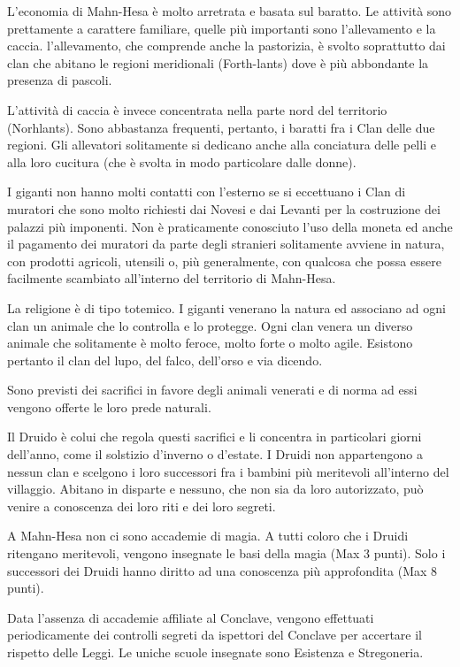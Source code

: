 \Economia L'economia di Mahn-Hesa \`e molto arretrata e basata sul baratto. Le
attivit\`a sono prettamente a carattere familiare, quelle pi\`u
importanti sono l'allevamento e la caccia. l'allevamento, che
comprende anche la pastorizia, \`e svolto soprattutto dai clan che
abitano le regioni meridionali (Forth-lants) dove \`e pi\`u
abbondante la presenza di pascoli.

L'attivit\`a di caccia \`e invece concentrata nella parte nord del
territorio (Norhlants). Sono abbastanza frequenti, pertanto, i
baratti fra i Clan delle due regioni. Gli allevatori solitamente si
dedicano anche alla conciatura delle pelli e alla loro cucitura (che
\`e svolta in modo particolare dalle donne).

I giganti non hanno molti contatti con l'esterno se si eccettuano i
Clan di muratori che sono molto richiesti dai Novesi e dai Levanti per
la costruzione dei palazzi pi\`u imponenti. Non \`e praticamente
conosciuto l'uso della moneta ed anche il pagamento dei muratori da
parte degli stranieri solitamente avviene in natura, con prodotti
agricoli, utensili o, pi\`u generalmente, con qualcosa che possa
essere facilmente scambiato all'interno del territorio di Mahn-Hesa.

\Religione La religione \`e di tipo totemico. I giganti venerano la
natura ed associano ad ogni clan un animale che lo controlla e lo
protegge. Ogni clan venera un diverso animale che solitamente \`e
molto feroce, molto forte o molto agile. Esistono pertanto il clan del
lupo, del falco, dell'orso e via dicendo.

Sono previsti dei sacrifici in favore
degli animali venerati e di norma ad essi vengono offerte le loro
prede naturali.

 Il Druido \`e colui che regola questi sacrifici e li
concentra in particolari giorni dell'anno, come il solstizio d'inverno
o d'estate. I Druidi non appartengono a nessun clan e scelgono i loro
successori fra i bambini pi\`u meritevoli all'interno del villaggio.
Abitano in disparte e nessuno, che non sia da loro autorizzato,
pu\`o venire a conoscenza dei loro riti e dei loro segreti.

\Magia A Mahn-Hesa non ci sono accademie di magia. A tutti coloro che
i Druidi ritengano meritevoli, vengono insegnate le basi della magia
(Max 3 punti). Solo i successori dei Druidi hanno diritto ad una
conoscenza pi\`u approfondita (Max 8 punti).

Data l'assenza di accademie affiliate al Conclave, vengono effettuati
periodicamente dei controlli segreti da ispettori del Conclave per
accertare il rispetto delle Leggi. Le uniche scuole insegnate sono
Esistenza e Stregoneria.

